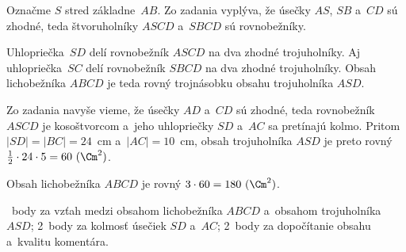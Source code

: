 {%
Označme $S$ stred základne~$AB$.
Zo zadania vyplýva, že úsečky $AS$, $SB$ a~$CD$ sú zhodné, teda štvoruholníky $ASCD$ a~$SBCD$ sú rovnobežníky.
%

Uhlopriečka~$SD$ delí rovnobežník $ASCD$ na dva zhodné trojuholníky.
Aj uhlopriečka~$SC$ delí rovnobežník $SBCD$ na dva zhodné trojuholníky.
Obsah lichobežníka $ABCD$ je teda rovný trojnásobku obsahu trojuholníka $ASD$.

Zo zadania navyše vieme, že úsečky $AD$ a~$CD$ sú zhodné, teda rovnobežník $ASCD$ je kosoštvorcom a~jeho uhlopriečky $SD$ a~$AC$ sa pretínajú kolmo.
Pritom $|SD|=|BC|=24$~cm a~$|AC|=10$~cm, obsah trojuholníka $ASD$ je preto rovný $\frac12\cdot24\cdot5=60\ (\Cm^2)$.

Obsah lichobežníka $ABCD$ je rovný $3\cdot 60=180\ (\Cm^2)$.

~body za vzťah medzi obsahom lichobežníka $ABCD$ a~obsahom trojuholníka $ASD$;
2~body za kolmosť úsečiek $SD$ a~$AC$;
2~body za dopočítanie obsahu a~kvalitu komentára.
\endhodnotenie}

